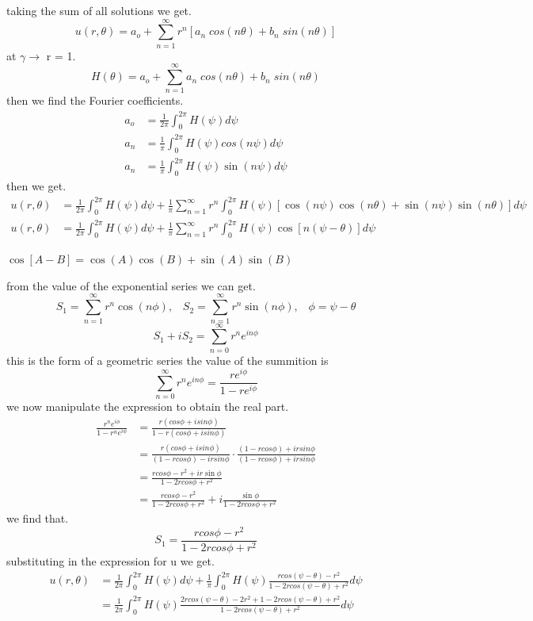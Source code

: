 \documentclass[]{article}
\begin{document}
taking the sum of all solutions we get.
\[
    u(r,\theta) = a_o + \sum_{n=1}^{\infty} r^n[a_n\;cos(n\theta)+b_n\;sin(n\theta)]    
\]
at $\gamma \longrightarrow $ r = 1.
\[
    H(\theta) = a_o + \sum_{n=1}^{\infty} a_n\;cos(n\theta)+b_n\;sin(n\theta) 
\]
then we find the Fourier coefficients.
\begin{align*}
a_o &= \frac{1}{2\pi}\int_{0}^{2\pi} H(\psi ) d\psi 
\\
a_n &=\frac{1}{\pi}\int_{0}^{2\pi} H(\psi ) cos(n\psi ) d\psi 
\\
a_n &=\frac{1}{\pi}\int_{0}^{2\pi} H(\psi ) \sin(n\psi ) d\psi 
\end{align*}
then we get.
\begin{align*}
u(r,\theta) &= \frac{1}{2\pi}\int_{0}^{2\pi} H(\psi ) d\psi  + \frac{1}{\pi}\sum_{n=1}^{\infty} r^n \int_{0}^{2\pi} H(\psi )[\cos(n\psi )\cos(n\theta) + \sin(n\psi )\sin(n\theta)]d\psi 
\\
u(r,\theta) &= \frac{1}{2\pi}\int_{0}^{2\pi} H(\psi ) d\psi  + \frac{1}{\pi}\sum_{n=1}^{\infty}r^n\int_{0}^{2\pi} H(\psi )\cos[n(\psi  - \theta)]d\psi 
\end{align*}
\begin{enrichment*}{}
    $\cos[A-B] = \cos(A)\cos(B) + \sin(A)\sin(B)$
\end{enrichment*}
from the value of the exponential series we can get.
\[
    S_1 = \sum_{n=1}^{\infty} r^n \cos(n\phi),\;\;\; S_2 =\sum_{n=1}^{\infty}r^n \sin(n\phi), \;\;\; \phi = \psi  - \theta    
\]
\[
    S_1 + i S_2 = \sum_{n=0}^{\infty} r^n e^{in\phi}    
\]
this is the form of a geometric series the value of the summition is
\[
    \sum_{n=0}^{\infty} r^n e^{in\phi} = \frac{r e^{i\phi}}{1- r e^{i\phi}}
\]
we now manipulate the expression to obtain the real part.
\\
\begin{align*}
\frac{r^n e^{i\phi}}{1- r^n e^{i\phi}} &= \frac{r(cos\phi+isin\phi)}{1-r(cos\phi+isin\phi)}
\\
&= \frac{r(cos\phi+isin\phi)}{(1-rcos\phi)-irsin\phi} \cdot \frac{(1-rcos\phi)+irsin\phi}{(1-rcos\phi)+irsin\phi}
\\
&= \frac{rcos\phi - r^2 + ir \sin\phi}{1-2rcos\phi+r^2}
\\
&= \frac{rcos\phi - r^2}{1-2rcos\phi+r^2} + i \frac{\sin\phi}{1-2rcos\phi+r^2}
\end{align*}
we find that.
\[
    S_1 = \frac{rcos\phi - r^2}{1-2rcos\phi+r^2}    
\]
substituting in the expression for u we get.
\begin{align*}
u(r,\theta) &= \frac{1}{2\pi}\int_{0}^{2\pi} H(\psi ) d\psi  + \frac{1}{\pi}\int_{0}^{2\pi} H(\psi )\frac{rcos(\psi  -\theta) - r^2}{1-2rcos(\psi  -\theta)+r^2}d\psi 
\\
            &= \frac{1}{2\pi}\int_{0}^{2\pi} H(\psi )\frac{2rcos(\psi  -\theta) - 2r^2+1-2rcos(\psi  -\theta)+r^2}{1-2rcos(\psi  -\theta)+r^2}d\psi 
\end{align*}
\end{document}
